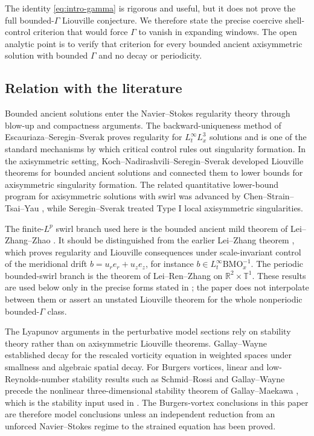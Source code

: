 \documentclass[11pt]{amsart}
\theoremstyle{plain}
\theoremstyle{definition}
\theoremstyle{remark}
\numberwithin{equation}{section}
\begin{document}
The identity \eqref{eq:intro-gamma} is rigorous and useful, but it does not
prove the full bounded-\(\Gamma\) Liouville conjecture.  We therefore state the
precise coercive shell-control criterion that would force \(\Gamma\) to vanish
in expanding windows.  The open analytic point is to verify that
criterion for every bounded ancient axisymmetric solution with bounded
\(\Gamma\) and no decay or periodicity.

\subsection*{Relation with the literature}

Bounded ancient solutions enter the Navier--Stokes regularity theory through
blow-up and compactness arguments.  The backward-uniqueness method of
Escauriaza--Seregin--Sverak \cite{ESS2003} proves regularity for
\(L^\infty_tL^3_x\) solutions and is one of the standard mechanisms by which
critical control rules out singularity formation.  In the axisymmetric setting,
Koch--Nadirashvili--Seregin--Sverak \cite{KNSS2009} developed Liouville
theorems for bounded ancient solutions and connected them to lower bounds for
axisymmetric singularity formation.  The related quantitative lower-bound
program for axisymmetric solutions with swirl was advanced by
Chen--Strain--Tsai--Yau \cite{CSTY2008,CSTY2009}, while
Seregin--Sverak \cite{SereginSverak2009} treated Type I local
axisymmetric singularities.

The finite-\(L^p\) swirl branch used here is the bounded ancient mild theorem
of Lei--Zhang--Zhao \cite{LZZ}.  It should be distinguished from the earlier
Lei--Zhang theorem \cite{LeiZhang2011}, which proves regularity and Liouville
consequences under scale-invariant control of the meridional drift
\(b=u_re_r+u_ze_z\), for instance \(b\in L^\infty_t\mathrm{BMO}^{-1}_x\).
The periodic bounded-swirl branch is the theorem of Lei--Ren--Zhang
\cite{LRZ} on \(\mathbb R^2\times\mathbb T^1\).  These results are used below
only in the precise forms stated in ;
the paper does not interpolate between them or assert an unstated Liouville
theorem for the whole nonperiodic bounded-\(\Gamma\) class.

The Lyapunov arguments in the perturbative model sections rely on stability
theory rather than on axisymmetric Liouville theorems.  Gallay--Wayne
\cite{GallayWayne2002} established decay for the rescaled vorticity equation
in weighted spaces under smallness and algebraic spatial decay.  For Burgers
vortices, linear and low-Reynolds-number stability results such as
Schmid--Rossi \cite{SchmidRossi2004} and Gallay--Wayne \cite{GallayWayne2006}
precede the nonlinear three-dimensional stability theorem of Gallay--Maekawa
\cite{GallayMaekawa}, which is the stability input used in
.  The Burgers-vortex conclusions in this paper are therefore
model conclusions unless an independent reduction from an unforced
Navier--Stokes regime to the strained equation has been proved.
\end{document}
